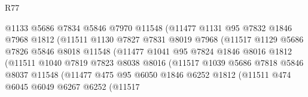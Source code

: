 \begin{lexlean}{R77}
\begin{coremodule}
                              @1133
                              @5686
                              @7834
                              @5846
                              @7970
                              @11548
                              (@11477
                                @1131
                                @95
                                @7832
                                @1846
                                @7968
                                @1812
                                (@11511
                                  @1130
                                  @7827
                                  @7831
                                  @8019
                                  @7968
                                  (@11517
                                    @1129
                                    @5686
                                    @7826
                                    @5846
                                    @8018
                                    @11548
                                    (@11477
                                      @1041
                                      @95
                                      @7824
                                      @1846
                                      @8016
                                      @1812
                                      (@11511
                                        @1040
                                        @7819
                                        @7823
                                        @8038
                                        @8016
                                        (@11517
                                          @1039
                                          @5686
                                          @7818
                                          @5846
                                          @8037
                                          @11548
                                          (@11477
                                            @475
                                            @95
                                            @6050
                                            @1846
                                            @6252
                                            @1812
                                            (@11511
                                              @474
                                              @6045
                                              @6049
                                              @6267
                                              @6252
                                              (@11517

\end{coremodule}
\end{lexlean}
